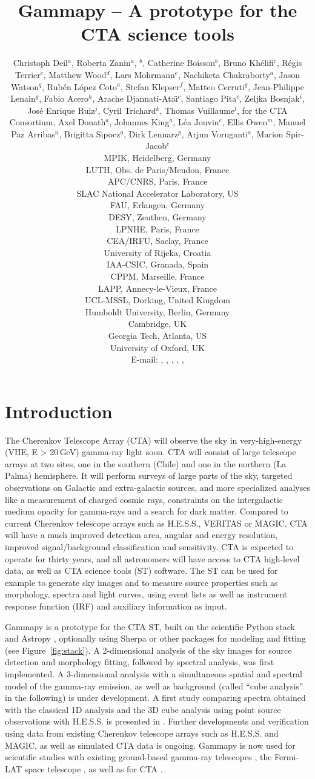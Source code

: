 \documentclass{PoS}
\title{Gammapy -- A prototype for the CTA science tools}
\author{
Christoph Deil$^a$,
Roberta Zanin$^a$,
\speaker{Julien Lefaucheur}$^b$,
Catherine Boisson$^b$,
Bruno Kh\'elifi$^c$,
R\'egis Terrier$^c$,
Matthew Wood$^d$,
Lars Mohrmann$^e$,
Nachiketa Chakraborty$^a$,
Jason Watson$^q$,
Rub\'en L\'opez Coto$^a$,
Stefan Klepser$^f$,
Matteo Cerruti$^g$,
Jean-Philippe Lenain$^g$,
Fabio Acero$^h$,
Arache Djannati-Ata{\"\i}$^c$,
Santiago Pita$^c$,
Zeljka Bosnjak$^i$,
Jos\'e Enrique Ruiz$^j$,
Cyril Trichard$^k$,
Thomas Vuillaume$^l$,
for the CTA Consortium,
Axel Donath$^a$,
Johannes King$^a$,
L\'ea Jouvin$^c$,
Ellis Owen$^m$,
Manuel Paz Arribas$^n$,
Brigitta Sipocz$^o$,
Dirk Lennarz$^p$,
Arjun Voruganti$^a$,
Marion Spir-Jacob$^c$
\\
\llap{$^a$}MPIK, Heidelberg, Germany\\
\llap{$^b$}LUTH, Obs. de Paris/Meudon, France\\
\llap{$^c$}APC/CNRS, Paris, France\\
\llap{$^d$}SLAC National Accelerator Laboratory, US\\
\llap{$^e$}FAU, Erlangen, Germany\\
\llap{$^f$}DESY, Zeuthen, Germany\\
\llap{$^g$}LPNHE, Paris, France\\
\llap{$^h$}CEA/IRFU, Saclay, France\\
\llap{$^i$}University of Rijeka, Croatia\\
\llap{$^j$}IAA-CSIC, Granada, Spain\\
\llap{$^k$}CPPM, Marseille, France\\
\llap{$^l$}LAPP, Annecy-le-Vieux, France\\
\llap{$^m$}UCL-MSSL, Dorking, United Kingdom\\
\llap{$^n$}Humboldt University, Berlin, Germany\\
\llap{$^o$}Cambridge, UK\\
\llap{$^p$}Georgia Tech, Atlanta, US\\
\llap{$^q$}University of Oxford, UK\\
E-mail:
\email{Christoph.Deil@mpi-hd.mpg.de},
\email{Roberta.Zanin@mpi-hd.mpg.de},
\email{julien.lefaucheur@obspm.fr},
\email{catherine.boisson@obspm.fr},
\email{khelifi@apc.in2p3.fr},
}
\begin{document}
\section{Introduction}
\label{sec:intro}

The Cherenkov Telescope Array (CTA) will observe the sky in very-high-energy
(VHE, E > 20$\,$GeV) gamma-ray light soon. CTA will consist of large telescope
arrays at two sites, one in the southern (Chile) and one in the northern (La
Palma) hemisphere. It will perform surveys of large parts of the sky, targeted
observations on Galactic and extra-galactic sources, and more specialized
analyses like a measurement of charged cosmic rays, constraints on the
intergalactic medium opacity for gamma-rays and a search for dark matter.
Compared to current Cherenkov telescope arrays such as H.E.S.S., VERITAS or
MAGIC, CTA will have a much improved detection area, angular and energy
resolution, improved signal/background classification and sensitivity. CTA is
expected to operate for thirty years, and all astronomers will have access to
CTA high-level data, as well as CTA science tools (ST) software. The ST can be
used for example to generate sky images and to measure source properties such as
morphology, spectra and light curves, using event lists as well as instrument
response function (IRF) and auxiliary information as input. 

Gammapy is a prototype for the CTA ST, built on the scientific Python stack and
Astropy \cite{astropy}, optionally using Sherpa \cite{sherpa2001, sherpa2009,
sherpa2011} or other packages for modeling and fitting (see
Figure~\ref{fig:stack}). A 2\hbox{-}dimensional analysis of the sky images for
source detection and morphology fitting, followed by spectral analysis, was
first  implemented. A 3\hbox{-}dimensional analysis with a simultaneous spatial
and spectral model of the gamma-ray emission, as well as background (called
``cube analysis'' in the following) is under development.
A first study comparing spectra obtained with the classical 1D analysis and the
3D cube analysis using point source observations with H.E.S.S. is presented in
\cite{lea}. Further developments and verification using data from existing
Cherenkov telescope arrays such as H.E.S.S. and MAGIC, as well as simulated CTA
data is ongoing.
Gammapy is now used for scientific studies with existing ground-based gamma-ray
telescopes \cite{hgps, shells}, the Fermi-LAT space telescope \cite{owen2015},
as well as for CTA \cite{julien, roberta, cyril}.
\end{document}
